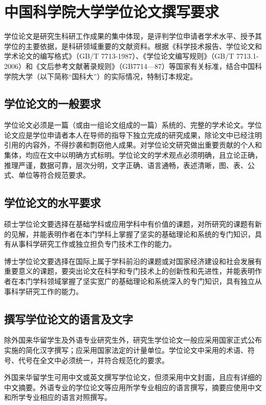 
\chapter{中国科学院大学学位论文撰写要求}
学位论文是研究生科研工作成果的集中体现，是评判学位申请者学术水平、授予其学位的主要依据，是科研领域重要的文献资料。根据《科学技术报告、学位论文和学术论文的编写格式》（GB/T 7713-1987）、《学位论文编写规则》（GB/T 7713.1-2006）和《文后参考文献著录规则》（GB7714—87）等国家有关标准，结合中国科学院大学（以下简称“国科大”）的实际情况，特制订本规定。

\section{学位论文的一般要求}

学位论文必须是一篇（或由一组论文组成的一篇）系统的、完整的学术论文。学位论文应是学位申请者本人在导师的指导下独立完成的研究成果，除论文中已经注明引用的内容外，不得抄袭和剽窃他人成果。对学位论文研究做出重要贡献的个人和集体，均应在文中以明确方式标明。学位论文的学术观点必须明确，且立论正确，推理严谨，数据可靠，层次分明，文字正确、语言通畅，表述清晰，图、表、公式、单位等符合规范要求。

\section{学位论文的水平要求}

硕士学位论文要选择在基础学科或应用学科中有价值的课题，对所研究的课题有新的见解，并能表明作者在本门学科上掌握了坚实的基础理论和系统的专门知识，具有从事科学研究工作或独立担负专门技术工作的能力。

博士学位论文要选择在国际上属于学科前沿的课题或对国家经济建设和社会发展有重要意义的课题，要突出论文在科学和专门技术上的创新性和先进性，并能表明作者在本门学科领域掌握了坚实宽广的基础理论和系统深入的专门知识，具有独立从事科学研究工作的能力。

\section{撰写学位论文的语言及文字}

除外国来华留学生及外语专业研究生外，研究生学位论文一般应采用国家正式公布实施的简化汉字撰写；应采用国家法定的计量单位。学位论文中采用的术语、符号、代号在全文中必须统一，并符合规范化的要求。

外国来华留学生可用中文或英文撰写学位论文，但须采用中文封面，且应有详细的中文摘要。外语专业的学位论文等应用所学专业相应的语言撰写，摘要应使用中文和所学专业相应的语言对照撰写。

